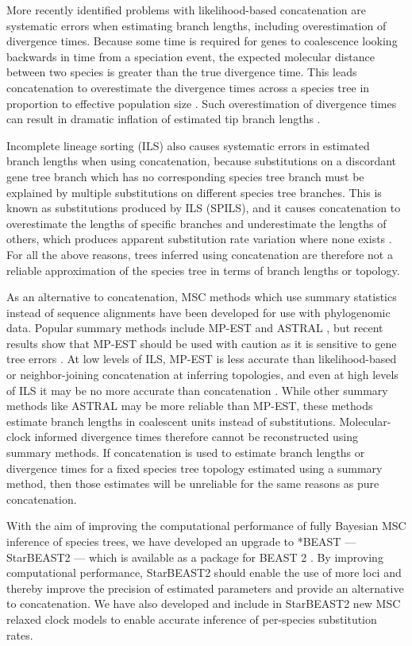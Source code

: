 \documentclass[nogrid]{MBE}%
\begin{document}
More recently identified problems with likelihood-based concatenation are systematic errors when
estimating branch lengths, including overestimation of divergence times. Because
some time is required for genes to coalescence looking backwards in time from
a speciation event, the expected molecular distance between two species is
greater than the true divergence time. This leads concatenation to overestimate
the divergence times across a species tree in proportion to effective population size
\citep{Angelis874}. Such overestimation of divergence times can result in dramatic
inflation of estimated tip branch lengths \citep{Ogilvie01052016}.

Incomplete lineage sorting (ILS) also causes systematic errors in estimated
branch lengths when using concatenation, because substitutions on a discordant gene tree branch
which has no corresponding species tree branch must be explained by multiple
substitutions on different species tree branches. This is known as substitutions
produced by ILS (SPILS), and it causes concatenation to overestimate the lengths of specific
branches and underestimate the lengths of others, which produces apparent
substitution rate variation where none exists \citep{Mendes01072016}. For all
the above reasons, trees
inferred using concatenation are therefore not a reliable approximation of the
species tree in terms of branch lengths or topology.

As an alternative to concatenation, MSC methods which use summary statistics instead
of sequence alignments have been developed for use with phylogenomic data.
Popular summary methods include MP-EST and ASTRAL \citep{Liu2010,
Mirarab01092014}, but recent results show that MP-EST should be used with caution as it is
sensitive to gene tree errors \citep{Mirarab15062015, Xi201563}. At low levels of
ILS, MP-EST is less accurate than likelihood-based or neighbor-joining concatenation at
inferring topologies, and even at high levels of ILS it may be no more accurate
than concatenation \citep{Ogilvie01052016}. While other summary methods like
ASTRAL may be more reliable than MP-EST, these methods estimate branch lengths
in coalescent units instead of substitutions. Molecular-clock informed divergence times therefore cannot be
reconstructed using summary methods. If concatenation is used to estimate branch
lengths or divergence times for a fixed species tree
topology estimated using a summary method, then those estimates will be
unreliable for the same reasons as pure concatenation.

With the aim of improving the computational performance of fully Bayesian
MSC inference of species trees, we have developed an upgrade
to *BEAST --- StarBEAST2 --- which is available as a package for BEAST 2
\citep{10.1371/journal.pcbi.1003537}. By improving computational performance,
StarBEAST2 should enable the use of more loci and thereby improve the precision
of estimated parameters and provide an alternative to concatenation. We have
also developed and include in StarBEAST2 new MSC relaxed
clock models to enable accurate inference of per-species substitution rates.
\end{document}
